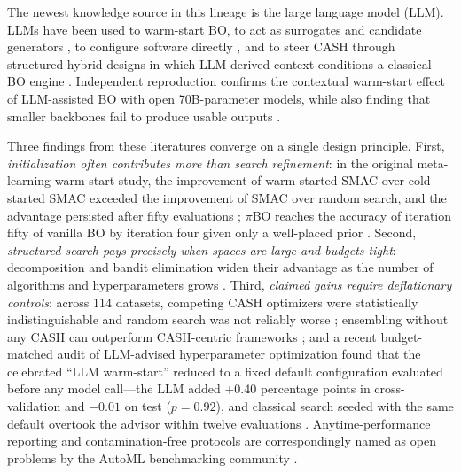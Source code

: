 The newest knowledge source in this lineage is the large language model (LLM). LLMs have been used to warm-start BO, to act as surrogates and candidate generators \cite{LiuEtAl2024, KristiadiEtAl2024}, to configure software directly \cite{Kannan2023, WangEtAl2025}, and to steer CASH through structured hybrid designs in which LLM-derived context conditions a classical BO engine \cite{XuEtAl2026a, XuEtAl2026b}. Independent reproduction confirms the contextual warm-start effect of LLM-assisted BO with open 70B-parameter models, while also finding that smaller backbones fail to produce usable outputs \cite{RychertEtAl2025}.


Three findings from these literatures converge on a single design principle. First, \emph{initialization often contributes more than search refinement}: in the original meta-learning warm-start study, the improvement of warm-started SMAC over cold-started SMAC exceeded the improvement of SMAC over random search, and the advantage persisted after fifty evaluations \cite{FeurerEtAl2015}; $\pi$BO reaches the accuracy of iteration fifty of vanilla BO by iteration four given only a well-placed prior \cite{HvarfnerEtAl2022}. Second, \emph{structured search pays precisely when spaces are large and budgets tight}: decomposition and bandit elimination widen their advantage as the number of algorithms and hyperparameters grows \cite{LiEtAl2020a, LiEtAl2021b}. Third, \emph{claimed gains require deflationary controls}: across 114 datasets, competing CASH optimizers were statistically indistinguishable and random search was not reliably worse \cite{ZollerHuber2019}; ensembling without any CASH can outperform CASH-centric frameworks \cite{EricksonEtAl2020}; and a recent budget-matched audit of LLM-advised hyperparameter optimization found that the celebrated ``LLM warm-start'' reduced to a fixed default configuration evaluated before any model call---the LLM added +0.40 percentage points in cross-validation and $-0.01$ on test ($p=0.92$), and classical search seeded with the same default overtook the advisor within twelve evaluations \cite{RodriguesEtAl2026}. Anytime-performance reporting and contamination-free protocols are correspondingly named as open problems by the AutoML benchmarking community \cite{GijsbersEtAl2019, EggenspergerEtAl2021}.

